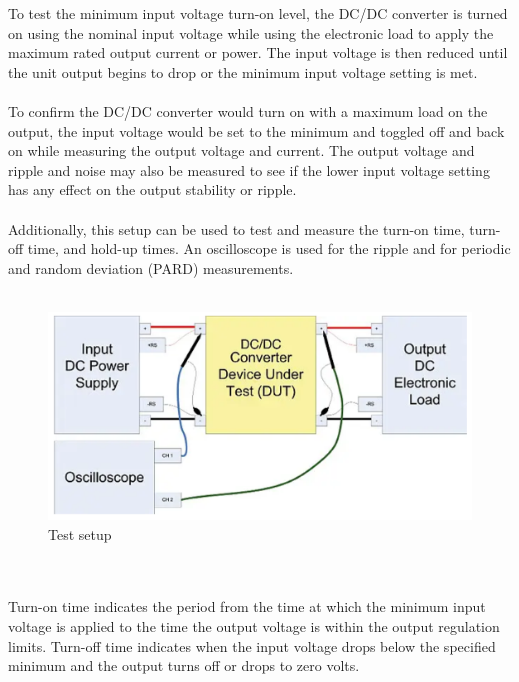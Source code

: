 To test the minimum input voltage turn-on level, the DC/DC converter is turned on using the nominal input voltage while using the electronic load to apply the maximum rated output current or power. The input voltage is then reduced until the unit output begins to drop or the minimum input voltage setting is met.
\\ \\
To confirm the DC/DC converter would turn on with a maximum load on the output, the input voltage would be set to the minimum and toggled off and back on while measuring the output voltage and current. The output voltage and ripple and noise may also be measured to see if the lower input voltage setting has any effect on the output stability or ripple.
\\ \\
Additionally, this setup can be used to test and measure the turn-on time, turn-off time, and hold-up times. An oscilloscope is used for the ripple and for periodic and random deviation (PARD) measurements.
\\ \\
\begin{figure}[h]
	\centering
	\includegraphics[width=\columnwidth]{IMGS/DCDCconverterTestSetup.png}
	\caption{Test setup}
	\label{fig:arch}
\end{figure} 
\\ \\	
Turn-on time indicates the period from the time at which the minimum input voltage is applied to the time the output voltage is within the output regulation limits. Turn-off time indicates when the input voltage drops below the specified minimum and the output turns off or drops to zero volts.
\\ \\
